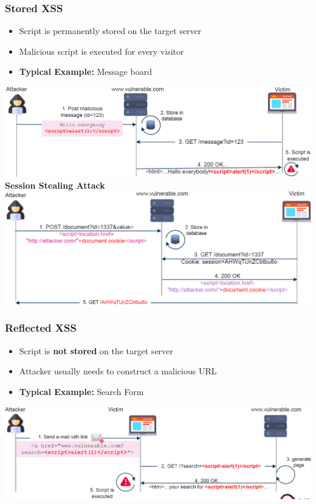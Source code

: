 \subsubsection{Stored XSS}
\begin{itemize}
    \item Script is permanently stored on the target server
    \item Malicious script is executed for every visitor
    \item \textbf{Typical Example:} Message board
\end{itemize}
\includegraphics[width=\linewidth]{../img/xss_stored.png}
\textbf{Session Stealing Attack}\\
\includegraphics[width=\linewidth]{../img/xss_stored2.png}

\subsubsection{Reflected XSS}
\begin{itemize}
    \item Script is \textbf{not stored} on the target server
    \item Attacker usually needs to construct a malicious URL
    \item \textbf{Typical Example:} Search Form
\end{itemize}
\includegraphics[width=\linewidth]{../img/xss_reflected.png}

